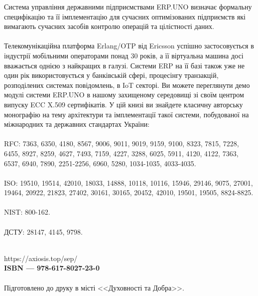 Система управління державними підприємствами ERP.UNO визначає формальну
специфікацію та її імплементацію для сучасних оптимізованих підприємств
які вимагають сучасних засобів контролю операцій та цілістності даних.
\\
\\
Телекомунікаційна платформа Erlang/OTP від Ericsson успішно застосовується
в індустрії мобільними операторами понад 30 років, а її віртуальна машина
досі вважається однією з найкращих в галузі. Системи ERP на її базі також
уже не один рік використовується у банківській сфері, процесінгу транзакцій,
розподілених системах повідомлень, в IoT секторі. Ви можете переглянути демо
модулі системи ERP.UNO в нашому захищеному середовищі зі своїм центром
випуску ECC X.509 сертифікатів. У цій книзі ви знайдете класичну авторську
монографію на тему архітектури та імплементації такої системи, побудованої
на міжнародних та державних стандартах України:
\\
\\
RFC: 7363, 6350, 4180,
     8567, 9006, 9011, 9019, 9159, 9100, 8323, 7815, 7228, 6455,
     8927, 8259, 4627, 7493, 7159, 4227, 3288, 6025, 5911, 4120, 4122, 7363, 6537, 6940, 7890,
     2251-2256, 6960, 5280, 1034-1035, 4033-4035.
\\
\\
ISO: 19510, 19514, 42010, 18033, 14888, 10118, 10116, 15946, 29146,
     9075, 27001,
     19464, 20922, 21823, 27402, 30161, 30165,
     20452, 42010, 19501, 19505,
     8824-8825.
\\
\\
NIST: 800-162.
\\
\\
ДСТУ: 28147, 4145, 9798.

\vspace{2cm}
\\
https://axiosis.top/sep/ \\

{\bf ISBN --- 978-617-8027-23-0 \hspace{2em}} \\ \\
Підготовлено до друку в місті <<Духовності та Добра>>. \\ \\

\newpage
\cleartorecto
\tableofcontents*
\mainmatter

